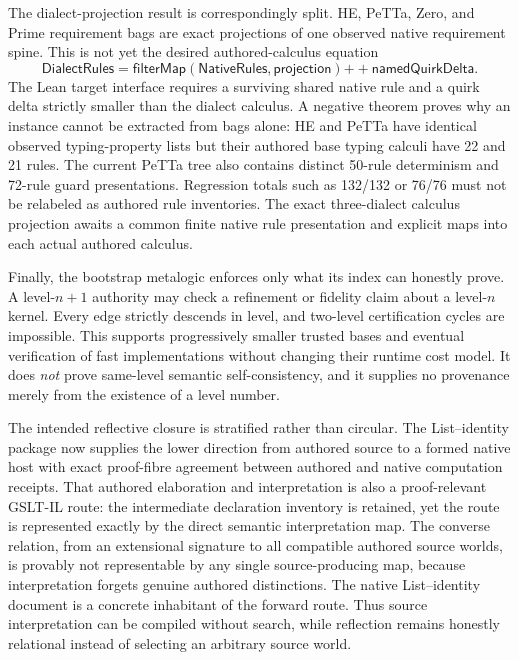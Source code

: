 \documentclass[11pt]{article}
\begin{document}
The dialect-projection result is correspondingly split.  HE, PeTTa, Zero, and
Prime requirement bags are exact projections of one observed native requirement
spine.  This is not yet the desired authored-calculus equation
\[
  \mathsf{DialectRules}
   = \mathsf{filterMap}(\mathsf{NativeRules},\mathsf{projection})
       \mathbin{++} \mathsf{namedQuirkDelta}.
\]
The Lean target interface requires a surviving shared native rule and a quirk
delta strictly smaller than the dialect calculus.  A negative theorem proves why
an instance cannot be extracted from bags alone: HE and PeTTa have identical
observed typing-property lists but their authored base typing calculi have 22 and
21 rules.  The current PeTTa tree also contains distinct 50-rule determinism and
72-rule guard presentations.  Regression totals such as 132/132 or 76/76 must
not be relabeled as authored rule inventories.  The exact three-dialect
calculus projection awaits a common finite native rule presentation and explicit
maps into each actual authored calculus.

Finally, the bootstrap metalogic enforces only what its index can honestly prove.
A level-$n+1$ authority may check a refinement or fidelity claim about a level-$n$
kernel.  Every edge strictly descends in level, and two-level certification cycles
are impossible.  This supports progressively smaller trusted bases and eventual
verification of fast implementations without changing their runtime cost model.
It does \emph{not} prove same-level semantic self-consistency, and it supplies no
provenance merely from the existence of a level number.

The intended reflective closure is stratified rather than circular.  The
List--identity package now supplies the lower direction from authored source to
a formed native host with exact proof-fibre agreement between authored and
native computation receipts.  That authored elaboration and interpretation is
also a proof-relevant GSLT-IL route: the intermediate declaration inventory is
retained, yet the route is represented exactly by the direct semantic
interpretation map.  The converse relation, from an extensional signature to
all compatible authored source worlds, is provably not representable by any
single source-producing map, because interpretation forgets genuine authored
distinctions.  The native List--identity document is a concrete inhabitant of
the forward route.  Thus source interpretation can be compiled without search,
while reflection remains honestly relational instead of selecting an arbitrary
source world.
\end{document}
